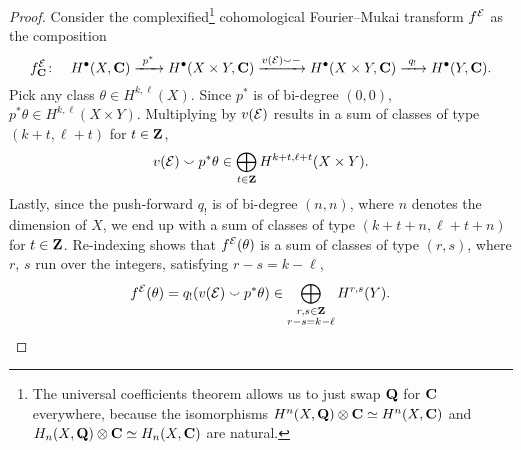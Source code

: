 \begin{proof}
    Consider the complexified\footnote{
        The universal coefficients theorem allows us to just swap $\mathbf Q$ for $\mathbf C$ everywhere, because the isomorphisms $H^{n}(X, \mathbf Q)\otimes \mathbf C \simeq H^{n}(X, \mathbf C)$ and $H_n(X, \mathbf Q)\otimes \mathbf C \simeq H_n(X, \mathbf C)$ are natural. 
    } cohomological Fourier--Mukai transform $f^{\mathcal E}$ as the composition
    \[  
        f^{\mathcal E}_\mathbf C \colon \quad H^{\bullet}(X, \mathbf C) \xrightarrow{\ p^* \ } H^{\bullet}(X \times Y, \mathbf C) \xrightarrow{v(\mathcal E) \smallsmile -} H^{\bullet}(X \times Y, \mathbf C) \xrightarrow{\ q_! \ } H^{\bullet}(Y, \mathbf C).
    \]
    Pick any class $\theta \in H^{k, \ell}(X)$. Since $p^*$ is of bi-degree $(0,0)$, $p^*\theta \in H^{k,\ell}(X \times Y)$. Multiplying by $v(\mathcal E)$ results in a sum of classes of type $(k + t, \ell + t)$ for $t \in \mathbf Z$, \ie
    \[
        v(\mathcal E) \smallsmile p^*\theta \in \bigoplus_{t \in \mathbf Z}H^{k + t, \ell + t}(X \times Y).
    \]
    Lastly, since the push-forward $q_!$ is of bi-degree $(n,n)$, where $n$ denotes the dimension of $X$, we end up with a sum of classes of type $(k + t + n, \ell + t + n)$ for $t \in \mathbf Z$. Re-indexing shows that $f^{\mathcal E}(\theta)$ is a sum of classes of type $(r,s)$, where $r$, $s$ run over the integers, satisfying $r - s = k - \ell$, \ie
    \[
        f^{\mathcal E}(\theta) = q_!(v(\mathcal E) \smallsmile p^*\theta) \in \bigoplus_{\substack{r,s\in \mathbf Z \\ r-s = k - \ell}}H^{r,s}(Y). \qedhere
    \]
\end{proof}